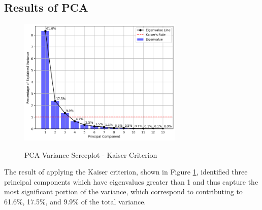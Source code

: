 \documentclass[12pt,a4paper]{article}
\numberwithin{figure}{section}
\numberwithin{table}{section}
\numberwithin{definition}{section}
\begin{document}
\newpage



\subsection{Results of PCA}
\label{ssec:pcaresults}



\begin{figure}[!h]
  \centering
  \caption{PCA Variance Screeplot - Kaiser Criterion}
  \includegraphics[width=0.7\textwidth]{PCA_Variance_Screeplot_kaiser.png}
  \label{fig:pckaiser}
\end{figure}

The result of applying the Kaiser criterion, shown in Figure \ref{fig:pckaiser}, identified three principal components which have eigenvalues greater than 1 and thus capture the most significant portion of the variance, which correspond to contributing to 61.6\%, 17.5\%, and 9.9\% of the total variance.
\end{document}
